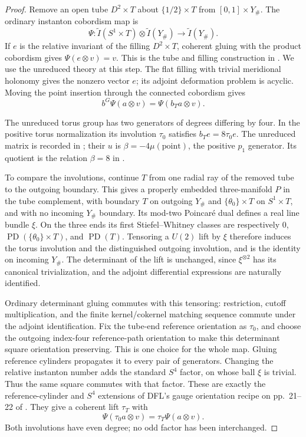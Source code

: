 \documentclass[11pt]{amsart}
\theoremstyle{definition}
\theoremstyle{remark}
\theoremstyle{plain}
\begin{document}
\begin{proof}
Remove an open tube $D^2\times T$ about
$\{1/2\}\times T$ from $[0,1]\times Y_\#$.
The ordinary instanton cobordism map is
\[
 \Psi:\widetilde I(S^1\times T)\otimes
       \widetilde I(Y_\#)\longrightarrow\widetilde I(Y_\#).
\]
If $e$ is the relative invariant of the filling
$D^2\times T$, coherent gluing with the product
cobordism gives $\Psi(e\otimes v)=v$.
This is the tube and filling construction in
\cite[proof of Corollary~7.2,
arXiv version, pp.~53--54]{KronheimerMrowka10}.
We use the unreduced theory at this step.
The flat filling with trivial meridional holonomy
gives the nonzero vector $e$; its adjoint deformation
problem is acyclic. Moving the point insertion
through the connected cobordism gives
\[
             b^G\Psi(a\otimes v)=\Psi(b_Ta\otimes v).
\]

The unreduced torus group has two generators of
degrees differing by four. In the positive torus
normalization its involution $\tau_0$ satisfies
$b_Te=8\tau_0e$. The unreduced matrix is recorded
in \cite[Appendix~A, arXiv version, p.~26]{ChenScaduto18};
their $u$ is $\beta=-4\mu(\mathrm{point})$,
the positive $p_1$ generator. Its quotient is the
relation $\beta=8$ in \cite[Lemma~11]{Munoz99a}.

To compare the involutions, continue $T$ from
one radial ray of the removed tube to the outgoing
boundary. This gives a properly embedded
three-manifold $P$ in the tube complement, with
boundary $T$ on outgoing $Y_\#$ and
$\{\theta_0\}\times T$ on $S^1\times T$,
and with no incoming $Y_\#$ boundary.
Its mod-two Poincar\'e dual defines a real line
bundle $\xi$. On the three ends its first
Stiefel--Whitney classes are respectively
$0$, $\operatorname{PD}(\{\theta_0\}\times T)$,
and $\operatorname{PD}(T)$.
Tensoring a $U(2)$ lift by $\xi$ therefore induces
the torus involution and the distinguished outgoing
involution, and is the identity on incoming $Y_\#$.
The determinant of the lift is unchanged, since
$\xi^{\otimes2}$ has its canonical trivialization,
and the adjoint differential expressions are
naturally identified.

Ordinary determinant gluing commutes with this
tensoring: restriction, cutoff multiplication,
and the finite kernel/cokernel matching sequence
commute under the adjoint identification.
Fix the tube-end reference orientation as $\tau_0$,
and choose the outgoing index-four reference-path
orientation to make this determinant square
orientation preserving. This is one choice
for the whole map. Gluing reference cylinders
propagates it to every pair of generators.
Changing the relative instanton number adds the
standard $S^4$ factor, on whose ball $\xi$ is
trivial. Thus the same square commutes with that
factor. These are exactly the reference-cylinder
and $S^4$ extensions of DFL's gauge orientation
recipe on pp.~21--22 of \cite{DaeFukLip21a}.
They give a coherent lift $\tau_T$ with
\[
                  \Psi(\tau_0a\otimes v)=
                                  \tau_T\Psi(a\otimes v).
\]
Both involutions have even degree; no odd
factor has been interchanged.


\end{proof}
\end{document}
